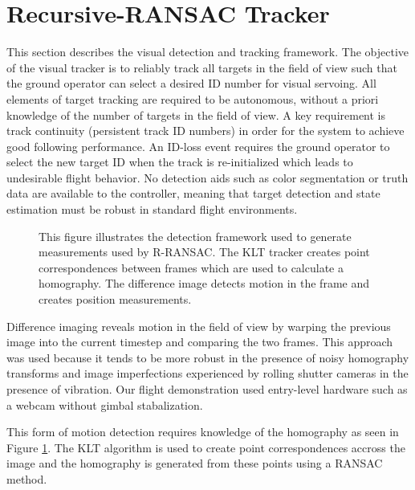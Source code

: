 \section{Recursive-RANSAC Tracker}
This section describes the visual detection and tracking framework. The objective of the visual tracker is to reliably track all targets in the field of view such that the ground operator can select a desired ID number for visual servoing. All elements of target tracking are required to be autonomous, without a priori knowledge of the number of targets in the field of view. A key requirement is track continuity (persistent track ID numbers) in order for the system to achieve good following performance. An ID-loss event requires the ground operator to select the new target ID when the track is re-initialized which leads to undesirable flight behavior. No detection aids such as color segmentation or truth data are available to the controller, meaning that target detection and state estimation must be robust in standard flight environments.
\begin{figure}[htbp]
	\centering
	\caption{This figure illustrates the detection framework used to generate measurements used by R-RANSAC. The KLT tracker creates point correspondences between frames which are used to calculate a homography. The difference image detects motion in the frame and creates position measurements.}
	\label{visual_tracking}
\end{figure}

Difference imaging reveals motion in the field of view by warping the previous image into the current timestep and comparing the two frames. This approach was used because it tends to be more robust in the presence of noisy homography transforms and image imperfections experienced by rolling shutter cameras in the presence of vibration. Our flight demonstration used entry-level hardware such as a webcam without gimbal stabalization.

This form of motion detection requires knowledge of the homography as seen in Figure \ref{visual_tracking}. The KLT algorithm is used to create point correspondences accross the image and the homography is generated from these points using a RANSAC method.

